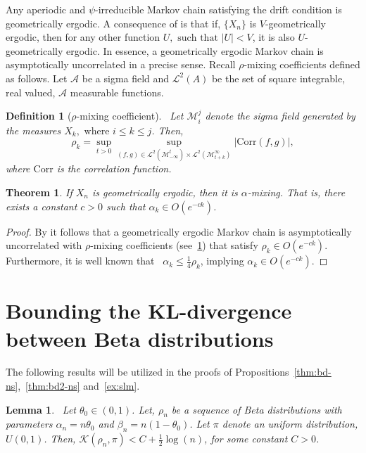 \documentclass[11pt]{amsart}
\newcommand{\psirr}{$\psi$-irreducible }
\newtheorem{defn}{Definition}[section]
\newtheorem{theorem}{Theorem}[section]
\newtheorem{lemma}{Lemma}[section]
\begin{document}
Any aperiodic and \psirr Markov chain satisfying the drift condition is geometrically ergodic. A consequence of  is that if, $\{X_n\}$ is $V$-geometrically ergodic, then for any other function $U, \text{ such that }|U|<V$, it is also $U$-geometrically ergodic. In essence, a geometrically ergodic Markov chain is asymptotically uncorrelated in a precise sense. Recall $\rho$-mixing coefficients defined as follows. Let $\mathcal{A}$ be a sigma field and $\mathcal{L}^2(A)$ be the set of square integrable, real valued, $\mathcal{A}$ measurable functions.

\begin{defn}[{$\rho$-mixing coefficient}]~\label{def:rho-mix}
Let $\mathcal{M}_i^j$ denote the sigma field generated by the measures $X_k, \text{ where } i\leq k\leq j$. Then,
\begin{equation}
    \rho_k = \underset{t>0}{\sup}\underset{(f,g) \in \mathcal{L}^2\left(\mathcal{M}_{-\infty}^t\right) \times  \mathcal{L}^2\left(\mathcal{M}_{t+k}^{\infty}\right)}{\sup}\left|\mathrm{Corr}(f,g)\right|,
\end{equation}
where $\mathrm{Corr}$ is the correlation function.
\end{defn}


\begin{theorem}\label{theorem:jones}
  If $X_n$ is geometrically ergodic, then it is $\alpha$-mixing. That is, there exists a constant $c>0$ such that $\alpha_k \in O(e^{-ck})$.
\end{theorem}
\begin{proof}
By \cite[Theorem 2]{jones} it follows that a geometrically ergodic Markov chain is asymptotically uncorrelated with $\rho$-mixing coefficients (see~\cref{def:rho-mix}) that satisfy $\rho_k \in O(e^{-ck})$. Furthermore, it is well known that~\cite{bradley,jones} $\alpha_k\leq \frac{1}{4}\rho_k$, implying $\alpha_k \in O(e^{-ck})$.
\end{proof}

\section{Bounding the KL-divergence between Beta distributions}
The following results will be utilized in the proofs of Propositions~\ref{thm:bd-ns},~\ref{thm:bd2-ns} and~\ref{ex:slm}.
\begin{lemma}~\label{prop:kl-prior-unif}
Let $\theta_0\in(0,1)$. Let, $\rho_n$ be a sequence of Beta distributions with parameters $\alpha_n=n\theta_0$ and $\beta_n=n(1-\theta_0)$. Let $\pi$ denote an uniform distribution, $U(0,1)$. Then, $\mathcal{K}(\rho_n,\pi)<C+\frac{1}{2}\log (n)$, for some constant $C>0$. 
\end{lemma}
\end{document}
